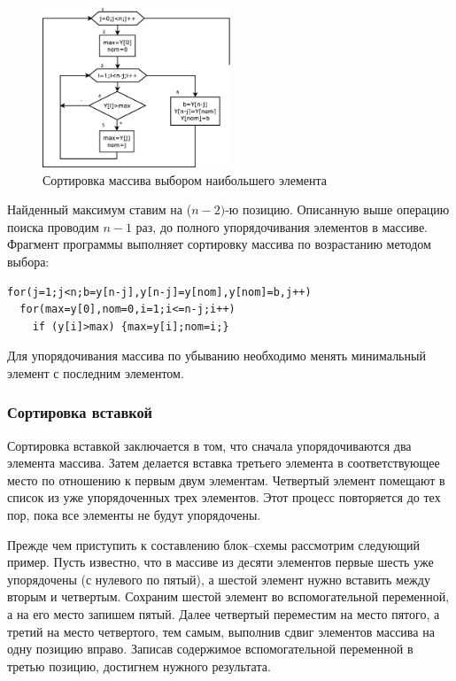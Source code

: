 \begin{figure}[htb]
\begin{center}
\includegraphics[width=0.5\textwidth]{img/ris_5_13}
\caption{Сортировка массива выбором наибольшего элемента}
\label{ch05:refDrawing12}
\end{center}
\end{figure}

Найденный максимум ставим на ($n-2)$-ю позицию. Описанную выше операцию поиска проводим
$n-1$ раз, до полного упорядочивания элементов в массиве. Фрагмент программы выполняет сортировку
массива по возрастанию методом выбора:
\begin{lstlisting}
for(j=1;j<n;b=y[n-j],y[n-j]=y[nom],y[nom]=b,j++)
  for(max=y[0],nom=0,i=1;i<=n-j;i++) 
    if (y[i]>max) {max=y[i];nom=i;}
\end{lstlisting}

Для упорядочивания массива по убыванию необходимо менять минимальный элемент с последним элементом.

\subsubsection[Сортировка вставкой]{Сортировка вставкой}
Сортировка вставкой заключается в том, что сначала упорядочиваются два элемента массива. Затем делается вставка третьего
элемента в соответствующее место по отношению к первым двум элементам. Четвертый элемент помещают в список из уже
упорядоченных трех элементов. Этот процесс повторяется до тех пор, пока все элементы не будут упорядочены. 

Прежде чем приступить к составлению блок–схемы рассмотрим следующий пример. Пусть известно, что в массиве из десяти
элементов первые шесть уже упорядочены (с нулевого по пятый), а шестой элемент нужно вставить между вторым и четвертым.
Сохраним шестой элемент во вспомогательной переменной, а на его место запишем пятый. Далее четвертый переместим на
место пятого, а третий на место четвертого, тем самым, выполнив сдвиг элементов массива на одну позицию вправо. Записав
содержимое вспомогательной переменной в третью позицию, достигнем нужного результата.

